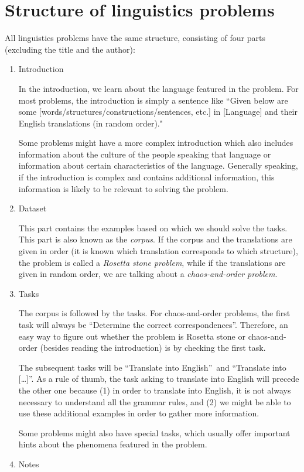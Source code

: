 \section{Structure of linguistics problems}
All linguistics problems have the same structure, consisting of four parts (excluding the title and the author):
\begin{enumerate} 
\item Introduction

In the introduction, we learn about the language featured in the problem. For most problems, the introduction is simply a sentence like ``Given below are some [words/structures/constructions/sentences, etc.] in [Language] and their English translations (in random order)."

Some problems might have a more complex introduction which also includes information about the culture of the people speaking that language or information about certain characteristics of the language. Generally speaking, if the introduction is complex and contains additional information, this information is likely to be relevant to solving the problem.
\item Dataset

This part contains the examples based on which we should solve the tasks. This part is also known as the \textit{corpus}. If the corpus and the translations are given in order (it is known which translation corresponds to which structure), the problem is called a \textit{Rosetta stone problem}, while if the translations are given in random order, we are talking about a \textit{chaos-and-order problem}.
\item Tasks

The corpus is followed by the tasks. For chaos-and-order problems, the first task will always be “Determine the correct correspondences”. Therefore, an easy way to figure out whether the problem is Rosetta stone or chaos-and-order (besides reading the introduction) is by checking the first task.

The subsequent tasks will be “Translate into English”\ and “Translate into […]”. As a rule of thumb, the task asking to translate into English will precede the other one because (1) in order to translate into English, it is not always necessary to understand all the grammar rules, and (2) we might be able to use these additional examples in order to gather more information.

Some problems might also have special tasks, which usually offer important hints about the phenomena featured in the problem.
\item Notes


\end{enumerate}
